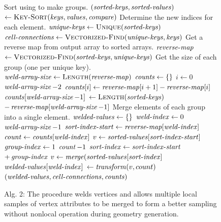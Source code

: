 \documentclass[10pt,journal,cspaper,compsoc]{IEEEtran}
\begin{document}
\noindent
\begin{figure}
\vspace{-.32cm}
\begin{codebox}
  \zi \Comment Sort  using  to make groups.
  \li $(\id{sorted-keys},\id{sorted-values})$
  \zi \>\> $\gets \proc{Key-Sort}(\id{keys},\id{values},\id{compare})$
  \zi \Comment Determine the new indices for each element.
  \li $\id{unique-keys} \gets \proc{Unique}(\id{sorted-keys})$
  \li $\id{cell-connections} \gets \proc{Vectorized-Find}(\id{unique-keys},\id{keys})$
  \zi \Comment Get a reverse map from output array to sorted arrays.
  \li $\id{reverse-map}$
  \zi \>\> $\gets \proc{Vectorized-Find}(\id{sorted-keys},\id{unique-keys})$
  \zi \Comment Get the size of each group (one per unique key).
  \li $\id{weld-array-size} \gets \proc{Length}(\id{reverse-map})$
  \li $\id{counts} \gets \{ \}$
  \li \For $i \gets 0$ \To $\id{weld-array-size} - 2$
  \zi \Do {}
  \li     $\id{counts}[i] \gets \id{reverse-map}[i+1] - \id{reverse-map}[i]$
      \End
  \li $\id{counts}[\id{weld-array-size}-1]$
  \zi \>\> $\gets \proc{Length}(\id{sorted-keys})$
  \zi \>\>\> $ - \id{reverse-map}[\id{weld-array-size}-1]$
  \zi \Comment Merge elements of each group into a single element.
  \li $\id{welded-values} \gets \{ \}$
  \li \For $\id{weld-index} \gets 0$ \To $\id{weld-array-size} - 1$
  \zi \Do {}
  \li     $\id{sort-index-start} \gets \id{reverse-map}[\id{weld-index}]$
  \li     $\id{count} \gets \id{counts}[\id{weld-index}]$
  \li     $v \gets \id{sorted-values}[\id{sort-index-start}]$
  \li     \For $\id{group-index} \gets 1$ \To $\id{count} - 1$
  \zi     \Do
  \li         $\id{sort-index} \gets \id{sort-index-start}$
  \zi         \>\>\>\> $+ \id{group-index}$
  \li         $v \gets \id{merge}(\id{sorted-values}[\id{sort-index}]$
          \End
  \li     $\id{welded-values}[\id{weld-index}]$
  \zi     \>\> $\gets \id{transform}(v, count)$
      \End
  \li \Return $(\id{welded-values}, \id{cell-connections}, \id{counts})$
\end{codebox}
\vspace{-0.47cm}
\caption*{Alg. 2: The  procedure welds vertices and allows multiple local samples of vertex attributes to be merged to form a better sampling without nonlocal operation during geometry generation.}
\end{figure}
\end{document}
